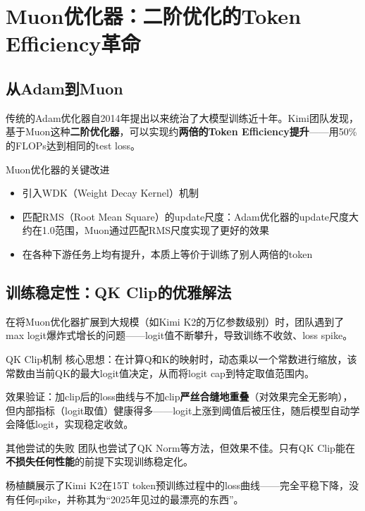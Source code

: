 \section{Muon优化器：二阶优化的Token Efficiency革命}

\subsection{从Adam到Muon}

传统的Adam优化器自2014年提出以来统治了大模型训练近十年。Kimi团队发现，基于Muon这种\textbf{二阶优化器}，可以实现约\textbf{两倍的Token Efficiency提升}——用50\%的FLOPs达到相同的test loss。

\begin{importantbox}{Muon优化器的关键改进}
\begin{itemize}
\item 引入WDK（Weight Decay Kernel）机制
\item 匹配RMS（Root Mean Square）的update尺度：Adam优化器的update尺度大约在1.0范围，Muon通过匹配RMS尺度实现了更好的效果
\item 在各种下游任务上均有提升，本质上等价于训练了别人两倍的token
\end{itemize}
\end{importantbox}

\subsection{训练稳定性：QK Clip的优雅解法}

在将Muon优化器扩展到大规模（如Kimi K2的万亿参数级别）时，团队遇到了max logit爆炸式增长的问题——logit值不断攀升，导致训练不收敛、loss spike。

\begin{knowledgebox}{QK Clip机制}
核心思想：在计算Q和K的映射时，动态乘以一个常数进行缩放，该常数由当前QK的最大logit值决定，从而将logit cap到特定取值范围内。

效果验证：加clip后的loss曲线与不加clip\textbf{严丝合缝地重叠}（对效果完全无影响），但内部指标（logit取值）健康得多——logit上涨到阈值后被压住，随后模型自动学会降低logit，实现稳定收敛。
\end{knowledgebox}

\begin{warningbox}{其他尝试的失败}
团队也尝试了QK Norm等方法，但效果不佳。只有QK Clip能在\textbf{不损失任何性能}的前提下实现训练稳定化。
\end{warningbox}

杨植麟展示了Kimi K2在15T token预训练过程中的loss曲线——完全平稳下降，没有任何spike，并称其为``2025年见过的最漂亮的东西''。


